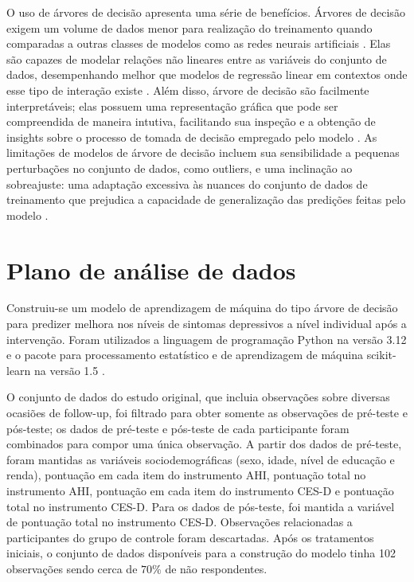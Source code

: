O uso de árvores de decisão apresenta uma série de benefícios. Árvores de decisão exigem um volume de dados menor para realização do treinamento quando comparadas a outras classes
de modelos como as redes neurais artificiais \cite{Theobald2021}. Elas são capazes de modelar relações não lineares entre as variáveis do conjunto de dados, desempenhando melhor
que modelos de regressão linear em contextos onde esse tipo de interação existe \cite{Bi2019}. Além disso, árvore de decisão são facilmente interpretáveis; elas possuem uma representação
gráfica que pode ser compreendida de maneira intutiva, facilitando sua inspeção e a obtenção de insights sobre o processo de tomada de decisão empregado pelo modelo \cite{Bi2019}.
As limitações de modelos de árvore de decisão incluem sua sensibilidade a pequenas perturbações no conjunto de dados, como outliers, e uma inclinação ao sobreajuste: uma adaptação
excessiva às nuances do conjunto de dados de treinamento que prejudica a capacidade de generalização das predições feitas pelo modelo \cite{Bi2019}.

\section{Plano de análise de dados}

Construiu-se um modelo de aprendizagem de máquina do tipo árvore de decisão para predizer melhora nos níveis de sintomas depressivos a nível individual após a intervenção.
Foram utilizados a linguagem de programação Python na versão 3.12 \cite{Python} e o pacote para processamento estatístico e de aprendizagem de máquina scikit-learn na versão
1.5 \cite{ScikitLearn}.

O conjunto de dados do estudo original, que incluia observações sobre diversas ocasiões de follow-up, foi filtrado para obter somente as observações de pré-teste e pós-teste; os dados de
pré-teste e pós-teste de cada participante foram combinados para compor uma única observação. A partir dos dados de pré-teste, foram mantidas as variáveis sociodemográficas (sexo, idade,
nível de educação e renda), pontuação em cada item do instrumento AHI, pontuação total no instrumento AHI, pontuação em cada item do instrumento CES-D e pontuação total no instrumento CES-D.
Para os dados de pós-teste, foi mantida a variável de pontuação total no instrumento CES-D. Observações relacionadas a participantes do grupo de controle foram descartadas. Após os tratamentos
iniciais, o conjunto de dados disponíveis para a construção do modelo tinha 102 observações sendo cerca de $70\%$ de não respondentes.

